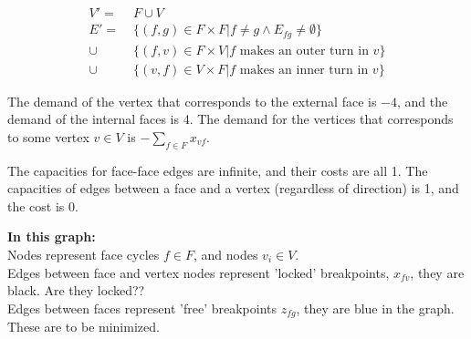 \begin{align*}
V' =\; &F \cup V \\
E' =\; &\{(f, g) \in F \times F | f \neq g \land E_{fg} \neq \emptyset\} \\
    \cup\; &\{(f, v) \in F \times V | f \text{ makes an outer turn in } v\} \\
    \cup\; &\{(v, f) \in V \times F | f \text{ makes an inner turn in } v\} 
\end{align*}

The demand of the vertex that corresponds to the external face is $-4$, and the demand of the internal faces is 4. The demand for the vertices that corresponds to some vertex $v \in V$ is $-\sum_{f \in F}{x_{vf}}$.

The capacities for face-face edges are infinite, and their costs are all 1. The capacities of edges between a face and a vertex (regardless of direction) is 1, and the cost is 0.

\textbf{In this graph:} \\
Nodes represent face cycles $f \in F$, and nodes $v_i \in V$.\\
Edges between face and vertex nodes represent 'locked' breakpoints, $x_{fv}$, they are black. Are they locked??\\
Edges between faces represent 'free' breakpoints $z_{fg}$, they are blue in the graph. These are to be minimized.

